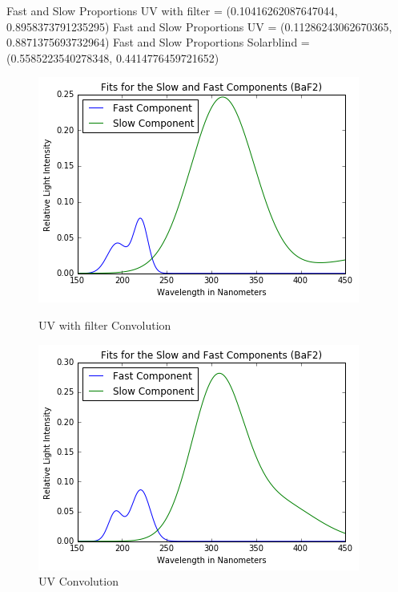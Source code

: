 \documentclass{article}
\begin{document}
\setlength{\parskip}{2em}
\noindent
Fast and Slow Proportions UV with filter = (0.10416262087647044, 0.8958373791235295)
\noindent
Fast and Slow Proportions UV = (0.11286243062670365, 0.8871375693732964)
\noindent
Fast and Slow Proportions Solarblind = (0.5585223540278348, 0.4414776459721652)

\begin{figure}[H]
  \centering
  \begin{minipage}[b]{0.4\textwidth}
    \includegraphics[width=\textwidth]{convf.png}
    \caption{UV with filter Convolution}
  \end{minipage}
  \hfill
  \begin{minipage}[b]{0.4\textwidth}
    \includegraphics[width=\textwidth]{convuv.png}
    \caption{UV Convolution}
  \end{minipage}
\end{figure}
\end{document}
